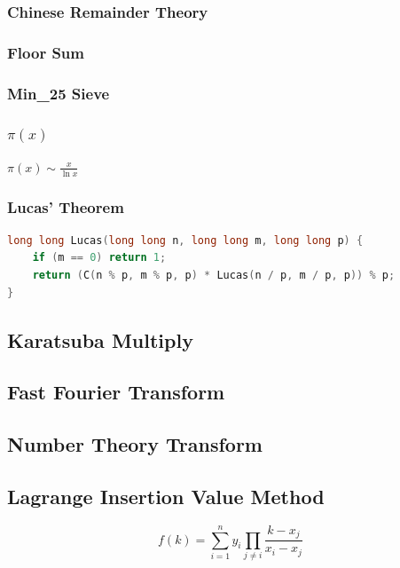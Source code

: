 \documentclass[10pt,UTF8,a4paper,twoside]{ctexart}
\begin{document}
\begin{multicols}{2}
		\subsubsection{Chinese Remainder Theory}
			
		\subsubsection{Floor Sum}
			
		
		\subsubsection{Min\_25 Sieve}
		\subsubsection{$\pi(x)$}
			$\pi(x)\sim \frac{x}{\ln x}$
			
		\subsubsection{Lucas' Theorem}
			\begin{lstlisting}[language=C++]
long long Lucas(long long n, long long m, long long p) {
	if (m == 0) return 1;
	return (C(n % p, m % p, p) * Lucas(n / p, m / p, p)) % p;
}
			\end{lstlisting}
	\subsection{Karatsuba Multiply}
		
	\subsection{Fast Fourier Transform}
		
	\subsection{Number Theory Transform}
		
	\subsection{Lagrange Insertion Value Method}
		$$f(k)=\sum_{i=1}^{n}{y_i}\prod_{j \neq i}{\frac{k-x_j}{x_i-x_j}}$$
		
\clearpage


\end{multicols}
\end{document}
